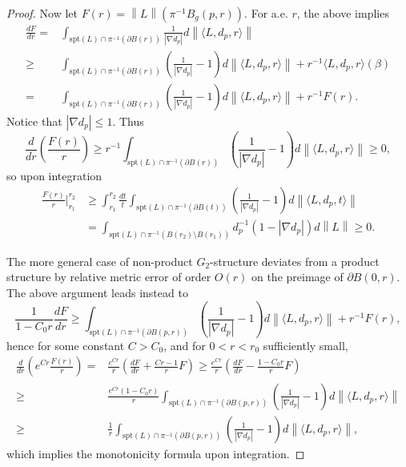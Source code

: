 \documentclass{article}
\theoremstyle{definition}
\newcommand{\norm}[1]{\left\lVert#1\right\rVert}
\begin{document}
\begin{proof}
			Now let $F(r)= \norm{L}(  \pi^{-1}B_g(p, r)  )$. For a.e. $r$, the above implies
			\[
			\begin{split}
				\frac{dF}{dr}= & \int_{  \text{spt}(L) \cap \pi^{-1}(\partial B(r))  } \frac{1}{|\nabla d_p| } d\norm{ \langle L, d_p, r\rangle}
				\\
			\geq &  \int_{  \text{spt}(L) \cap \pi^{-1}(\partial B(r))  } ( \frac{1}{|\nabla d_p| } -1) d\norm{ \langle L, d_p , r\rangle} + r^{-1}  \langle L, d_p, r\rangle (  \beta    )
			\\
			=  &  \int_{  \text{spt}(L) \cap \pi^{-1}(\partial B(r))  } ( \frac{1}{|\nabla d_p| } -1) d\norm{ \langle L, d_p, r\rangle} + r^{-1}  F(r).
			\end{split}
			\]
				Notice that $|\nabla d_p|\leq 1$. Thus
				\[
					\frac{d}{ dr }(\frac{F(r) }{r}  ) \geq r^{-1} \int_{  \text{spt}(L) \cap \pi^{-1}(\partial B(r))  } ( \frac{1}{|\nabla d_p|  } -1) d\norm{ \langle L, d_p, r\rangle}  \geq 0,
				\]
				so upon integration
				\begin{equation}
			\begin{split}
					\frac{F(r) }{r}  \vert_{r_1}^{r_2} 	 & \geq  \int_{r_1}^{r_2} \frac{dt}{t}  \int_{  \text{spt}(L) \cap \pi^{-1}(\partial B(t))  } ( \frac{1}{|\nabla d_p | } -1) d\norm{ \langle L, d_p, t \rangle} 
			\\
			& =\int_{    \text{spt}(L) \cap \pi^{-1} (B(r_2)\setminus B(r_1))  }  d_p^{-1} ( 1- |\nabla d_p| ) d\norm{ L} 
		\geq 0.
			\end{split}
				\end{equation}
				

				
				
				The more general case of non-product $G_2$-structure deviates from a product structure by relative metric error of order $O(r)$ on the preimage of $\partial B(0,r)$. The above argument leads instead to 
				\[
				\frac{1}{1-C_0 r}	\frac{dF}{dr} \geq  \int_{  \text{spt}(L) \cap \pi^{-1}(\partial B(p,r))  } ( \frac{1}{|\nabla d_p|  } -1) d\norm{ \langle L, d_p, r\rangle} + r^{-1}  F(r),
				\]
				hence for some constant $C>C_0$, and for $0< r< r_0$ sufficiently small,
				\[
				\begin{split}
						\frac{d}{dr} (e^{Cr} \frac{F(r)}{r})=& \frac{e^{Cr} }{r} ( \frac{dF}{dr} + \frac{C r-1}{r} F   ) \geq \frac{e^{Cr} }{r} ( \frac{dF}{dr} - \frac{1-C_0 r}{r} F   )
						\\
						\geq & \frac{e^{Cr}   (1-C_0r) }{r  }  \int_{  \text{spt}(L) \cap \pi^{-1}(\partial B(p,r))  } ( \frac{1}{|\nabla d_p|  } -1) d\norm{ \langle L, d_p, r\rangle} 
						\\
						\geq  & \frac{1}{r}   \int_{  \text{spt}(L) \cap \pi^{-1}(\partial B(p,r))  } ( \frac{1}{|\nabla d_p|  } -1) d\norm{ \langle L, d_p, r\rangle} ,
				\end{split}
				\]
			which implies the monotonicity formula upon integration.
				\end{proof}
				
\end{document}
